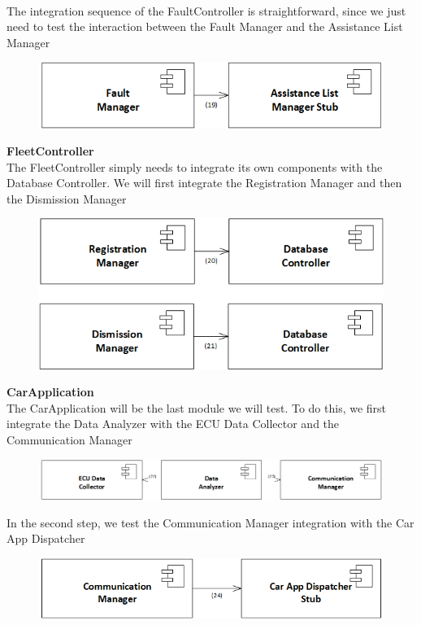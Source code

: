 \documentclass{article}
\begin{document}
\\
The integration sequence of the FaultController is straightforward, since we just need to test the interaction between the Fault Manager and the Assistance List Manager 
\begin{figure}[H]
\includegraphics[scale=0.5]{FaultController/FaultController}
\centering
\end{figure}
\textbf{FleetController}
\\
The FleetController simply needs to integrate its own components with the Database Controller. We will first integrate the Registration Manager and then the Dismission Manager
\begin{figure}[H]
\includegraphics[scale=0.5]{FleetController/FleetController}
\centering
\end{figure}
\textbf{CarApplication}
\\
The CarApplication will be the last module we will test. To do this, we first integrate the Data Analyzer with the ECU Data Collector and the Communication Manager
\begin{figure}[H]
\includegraphics[scale=0.5]{CarApplication/CarApplication1}
\centering
\end{figure}
In the second step, we test the Communication Manager integration with the Car App Dispatcher
\begin{figure}[H]
\includegraphics[scale=0.5]{CarApplication/CarApplication2}
\centering
\end{figure}
\end{document}
